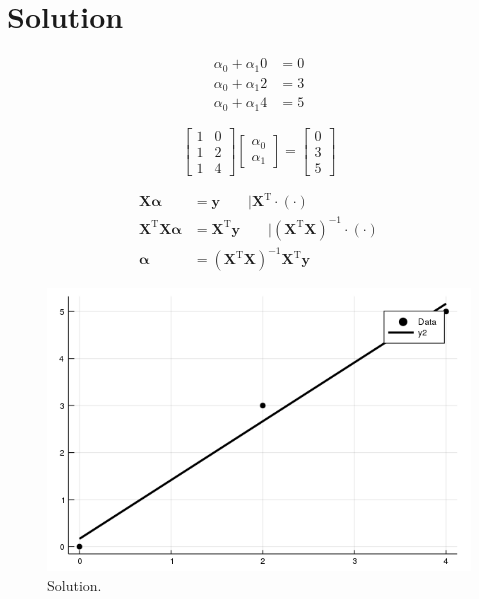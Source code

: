 \documentclass[12pt]{article}
\begin{document}
\section{Solution}

\begin{align*}
\alpha_{0}+\alpha_{1}0 & =0\\
\alpha_{0}+\alpha_{1}2 & =3\\
\alpha_{0}+\alpha_{1}4 & =5
\end{align*}


\[
\left[\begin{array}{cc}
1 & 0\\
1 & 2\\
1 & 4
\end{array}\right]\left[\begin{array}{c}
\alpha_{0}\\
\alpha_{1}
\end{array}\right]=\left[\begin{array}{c}
0\\
3\\
5
\end{array}\right]
\]

\begin{align*}
\boldsymbol{X}\boldsymbol{\alpha} & =\boldsymbol{y}\qquad|\boldsymbol{X}^{\mathrm{T}}\cdot\left(\cdot\right)\\
\boldsymbol{X}^{\mathrm{T}}\boldsymbol{X}\boldsymbol{\alpha} & =\boldsymbol{X}^{\mathrm{T}}\boldsymbol{y}\qquad|\left(\boldsymbol{X}^{\mathrm{T}}\boldsymbol{X}\right)^{-1}\cdot\left(\cdot\right)\\
\boldsymbol{\alpha} & =\left(\boldsymbol{X}^{\mathrm{T}}\boldsymbol{X}\right)^{-1}\boldsymbol{X}^{\mathrm{T}}\boldsymbol{y}
\end{align*}

\begin{figure}[ht]
\begin{centering}
\includegraphics[width=\columnwidth]{solution.png}
\end{centering}
\caption{Solution.}
\end{figure}
\end{document}
